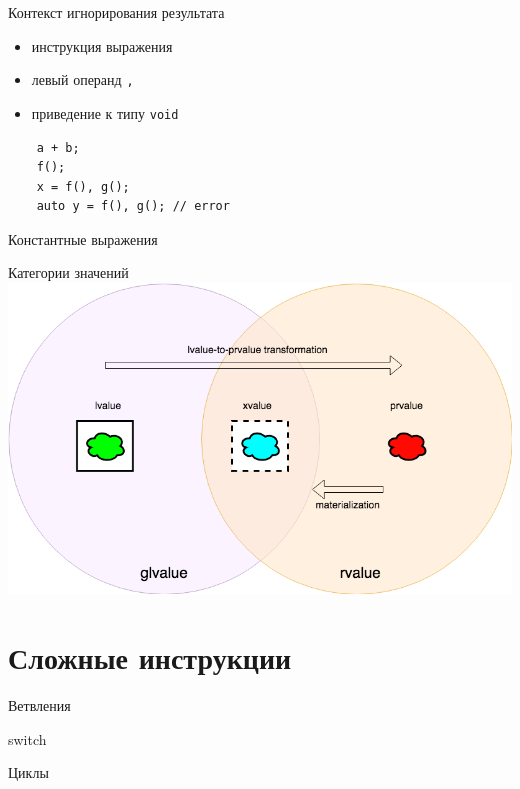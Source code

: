 \documentclass[unknownkeysallowed,xcolor=table]{beamer}
\begin{document}
\begin{frame}[fragile]{Контекст игнорирования результата}
  \begin{itemize}
    \item инструкция выражения \vspace{1em}
    \item левый операнд \lstinline{,} \vspace{1em}
    \item приведение к типу \lstinline{void}
  \end{itemize}
  \begin{lstlisting}
    a + b;
    f();
    x = f(), g();
    auto y = f(), g(); // error
  \end{lstlisting}
\end{frame}

\begin{frame}[fragile]{Константные выражения}
\end{frame}

\begin{frame}{Категории значений}
  \includegraphics[width = \textwidth,align=c,keepaspectratio]{images/value_categories.png}
\end{frame}

\section{Сложные инструкции}

\begin{frame}[fragile]{Ветвления}
\end{frame}

\begin{frame}[fragile]{switch}
\end{frame}

\begin{frame}[fragile]{Циклы}
\end{frame}
\end{document}

